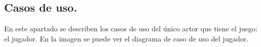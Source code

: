 \subsection{Casos de uso.}
En este apartado se describen los casos de uso del único actor que tiene el juego: el jugador. En la imagen se puede ver el diagrama de caso de uso del jugador.